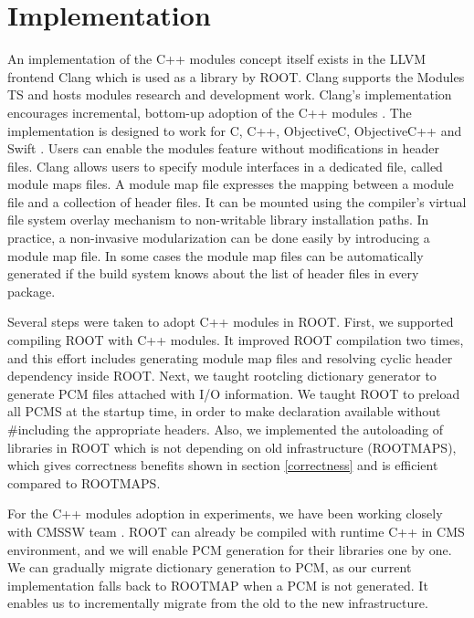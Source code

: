 \documentclass{webofc}
\begin{document}
\section{Implementation}
\label{implementation}

An implementation of the C++ modules concept itself exists in the LLVM frontend Clang \cite{clang-modules-doc} which is used as a library by ROOT. Clang supports the Modules TS and hosts modules research and development work. Clang's implementation encourages incremental, bottom-up adoption of the C++ modules \cite{Smith-cppcon}. The implementation is designed to work for C, C++, ObjectiveC, ObjectiveC++ and Swift \cite{Moduralize-doc}. Users can enable the modules feature without modifications in header files. Clang allows users to specify module interfaces in a dedicated file, called module maps files. A module map file expresses the mapping between a module file and a collection of header files. It can be mounted using the compiler’s virtual file system overlay mechanism to non-writable library installation paths. In practice, a non-invasive modularization can be done easily by introducing a module map file. In some cases the module map files can be automatically generated if the build system knows about the list of header files in every package.

Several steps were taken to adopt C++ modules in ROOT. First, we supported compiling ROOT with C++ modules. It improved ROOT compilation two times, and this effort includes generating module map files and resolving cyclic header dependency inside ROOT. Next, we taught rootcling dictionary generator to generate PCM files attached with I/O information. We taught ROOT to preload all PCMS at the startup time, in order to make declaration available without \#including the appropriate headers. Also, we implemented the autoloading of libraries in ROOT which is not depending on old infrastructure (ROOTMAPS), which gives correctness benefits shown in section \ref{correctness} and is efficient compared to ROOTMAPS.


For the C++ modules adoption in experiments, we have been working closely with CMSSW team \cite{cms}. ROOT can already be compiled with runtime C++ in CMS environment, and we will enable PCM generation for their libraries one by one. We can gradually migrate dictionary generation to PCM, as our current implementation falls back to ROOTMAP when a PCM is not generated. It enables us to incrementally migrate from the old to the new infrastructure.
\end{document}
